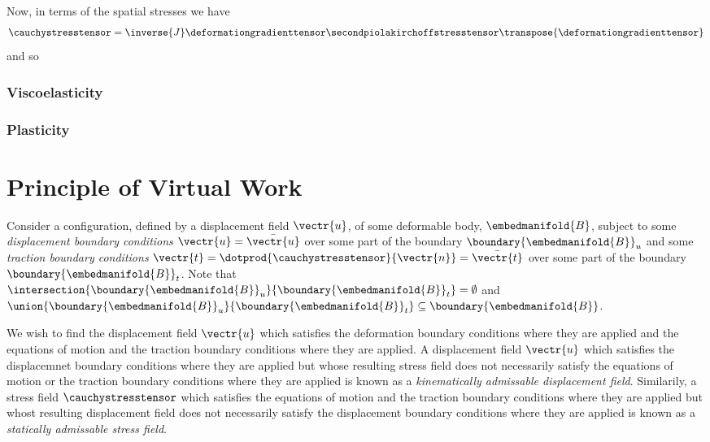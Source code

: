 Now, in terms of the spatial stresses we have
\begin{equation}
  \cauchystresstensor=\inverse{J}\deformationgradienttensor\secondpiolakirchoffstresstensor\transpose{\deformationgradienttensor}
\end{equation}
and so


\subsubsection{Viscoelasticity}

\subsubsection{Plasticity}

\section{Principle of Virtual Work}
\label{sec:ElasticityVirtualWork}

Consider a configuration, defined by a displacement field $\vectr{u}$, of some
deformable body, $\embedmanifold{B}$, subject to some \emph{displacement
  boundary conditions} $\vectr{u}=\bar{\vectr{u}}$ over some part of the
boundary $\boundary{\embedmanifold{B}}_{u}$ and some \emph{traction boundary
  conditions} $\vectr{t}=\dotprod{\cauchystresstensor}{\vectr{n}}=\bar{\vectr{t}}$
over some part of the boundary $\boundary{\embedmanifold{B}}_{t}$. Note that
$\intersection{\boundary{\embedmanifold{B}}_{u}}{\boundary{\embedmanifold{B}}_{t}}=\emptyset$
and
$\union{\boundary{\embedmanifold{B}}_{u}}{\boundary{\embedmanifold{B}}_{t}}\subseteq\boundary{\embedmanifold{B}}$.

We wish to find the displacement field $\vectr{u}$ which satisfies the
deformation boundary conditions where they are applied and the equations of
motion and the traction boundary conditions where they are applied. A
displacement field $\vectr{u}$ which satisfies the displacemnet boundary
conditions where they are applied but whose resulting stress field does not
necessarily satisfy the equations of motion or the traction boundary
conditions where they are applied is known as a \emph{kinematically admissable
  displacement field}. Similarily, a stress field $\cauchystresstensor$ which
satisfies the equations of motion and the traction boundary conditions where
they are applied but whost resulting displacement field does not necessarily
satisfy the displacement boundary conditions where they are applied is known
as a \emph{statically admissable stress field}.

